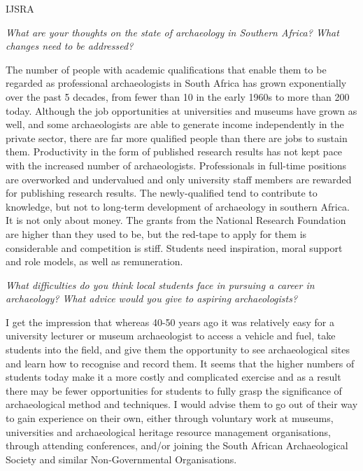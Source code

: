 \begin{labeling}{IJSRA}
\item[IJSRA] \emph{What are your thoughts on the state of archaeology in Southern Africa? What changes need to be addressed?}
	
\item[JD]
The number of people with academic qualifications that enable them to be regarded as professional archaeologists in South Africa has grown exponentially over the past 5 decades, from fewer than 10 in the early 1960s to more than 200 today. Although the job opportunities at universities and museums have grown as well, and some archaeologists are able to generate income independently in the private sector, there are far more qualified people than there are jobs to sustain them. Productivity in the form of published research results has not kept pace with the increased number of archaeologists. Professionals in full-time positions are overworked and undervalued and only university staff members are rewarded for publishing research results. The newly-qualified tend to contribute to knowledge, but not to long-term development of archaeology in southern Africa. It is not only about money. The grants from the National Research Foundation are higher than they used to be, but the red-tape to apply for them is considerable and competition is stiff. Students need inspiration, moral support and role models, as well as remuneration.


\item[IJSRA] \emph{What difficulties do you think local students face in pursuing a career in archaeology? What advice would you give to aspiring archaeologists?}
	
\item[JD]
I get the impression that whereas 40-50 years ago it was relatively easy for a university lecturer or museum archaeologist to access a vehicle and fuel, take students into the field, and give them the opportunity to see archaeological sites and learn how to recognise and record them. It seems that the higher numbers of students today make it a more costly and complicated exercise and as a result there may be fewer opportunities for students to fully grasp the significance of archaeological method and techniques. I would advise them to go out of their way to gain experience on their own, either through voluntary work at museums, universities and archaeological heritage resource management organisations, through attending conferences, and/or joining the South African Archaeological Society and similar Non-Governmental Organisations.


\end{labeling}
